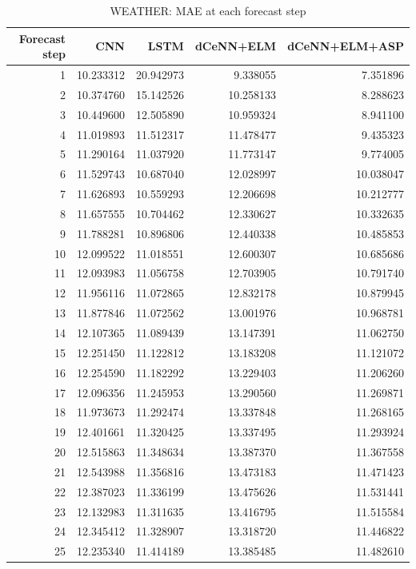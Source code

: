 \begin{table}
\caption{WEATHER: MAE at each forecast step}
\begin{tabular}{rrrrr}
\toprule
Forecast step & CNN & LSTM & dCeNN+ELM & dCeNN+ELM+ASP \\
\midrule
1 & 10.233312 & 20.942973 & 9.338055 & 7.351896 \\
2 & 10.374760 & 15.142526 & 10.258133 & 8.288623 \\
3 & 10.449600 & 12.505890 & 10.959324 & 8.941100 \\
4 & 11.019893 & 11.512317 & 11.478477 & 9.435323 \\
5 & 11.290164 & 11.037920 & 11.773147 & 9.774005 \\
6 & 11.529743 & 10.687040 & 12.028997 & 10.038047 \\
7 & 11.626893 & 10.559293 & 12.206698 & 10.212777 \\
8 & 11.657555 & 10.704462 & 12.330627 & 10.332635 \\
9 & 11.788281 & 10.896806 & 12.440338 & 10.485853 \\
10 & 12.099522 & 11.018551 & 12.600307 & 10.685686 \\
11 & 12.093983 & 11.056758 & 12.703905 & 10.791740 \\
12 & 11.956116 & 11.072865 & 12.832178 & 10.879945 \\
13 & 11.877846 & 11.072562 & 13.001976 & 10.968781 \\
14 & 12.107365 & 11.089439 & 13.147391 & 11.062750 \\
15 & 12.251450 & 11.122812 & 13.183208 & 11.121072 \\
16 & 12.254590 & 11.182292 & 13.229403 & 11.206260 \\
17 & 12.096356 & 11.245953 & 13.290560 & 11.269871 \\
18 & 11.973673 & 11.292474 & 13.337848 & 11.268165 \\
19 & 12.401661 & 11.320425 & 13.337495 & 11.293924 \\
20 & 12.515863 & 11.348634 & 13.387370 & 11.367558 \\
21 & 12.543988 & 11.356816 & 13.473183 & 11.471423 \\
22 & 12.387023 & 11.336199 & 13.475626 & 11.531441 \\
23 & 12.132983 & 11.311635 & 13.416795 & 11.515584 \\
24 & 12.345412 & 11.328907 & 13.318720 & 11.446822 \\
25 & 12.235340 & 11.414189 & 13.385485 & 11.482610 \\

\end{tabular}
\end{table}
